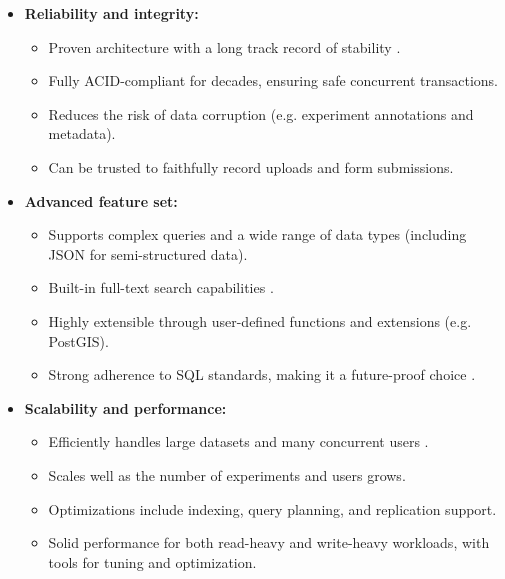 \begin{itemize} 
	\item \textbf{Reliability and integrity:} 
	\begin{itemize}
		\item Proven architecture with a long track record of stability \parencite{PostgresAbout}. 
		\item Fully ACID-compliant for decades, ensuring safe concurrent transactions. 
		\item Reduces the risk of data corruption (e.g. experiment annotations and metadata). 
		\item Can be trusted to faithfully record uploads and form submissions. 
	\end{itemize}
	
	\item \textbf{Advanced feature set:} 
	\begin{itemize}
		\item Supports complex queries and a wide range of data types (including JSON for semi-structured data). 
		\item Built-in full-text search capabilities \parencite{PostgresJSON,PostgresFTS}. 
		\item Highly extensible through user-defined functions and extensions (e.g. PostGIS). 
		\item Strong adherence to SQL standards, making it a future-proof choice \parencite{PostgresAbout}. 
	\end{itemize}
	
	\item \textbf{Scalability and performance:} 
	\begin{itemize}
		\item Efficiently handles large datasets and many concurrent users \parencite{PostgresAbout}. 
		\item Scales well as the number of experiments and users grows. 
		\item Optimizations include indexing, query planning, and replication support. 
		\item Solid performance for both read-heavy and write-heavy workloads, with tools for tuning and optimization. 
	\end{itemize}
	

\end{itemize}
